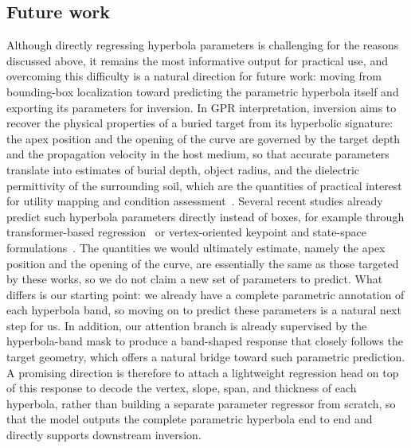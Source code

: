 \documentclass[lettersize,journal]{IEEEtran}
\begin{document}
\subsection{Future work}
Although directly regressing hyperbola parameters is challenging for the reasons
discussed above, it remains the most informative output for practical use, and
overcoming this difficulty is a natural direction for future work: moving from
bounding-box localization toward predicting the parametric hyperbola itself and
exporting its parameters for inversion. In GPR interpretation, inversion aims to
recover the physical properties of a buried target from its hyperbolic signature: the apex position
and the opening of the curve are governed by the target depth and the
propagation velocity in the host medium, so that accurate parameters translate
into estimates of burial depth, object radius, and the dielectric permittivity of
the surrounding soil, which are the quantities of practical interest for utility
mapping and condition assessment~\cite{liu2022pipeline}.
Several recent studies already predict such hyperbola parameters directly instead of
boxes, for example through transformer-based regression~\cite{jin2024gprformer,ge2024gprtransunet}
or vertex-oriented keypoint and state-space formulations~\cite{hou2025endtoend,lan2024statespace}.
The quantities we would ultimately estimate, namely the apex position and the opening of the
curve, are essentially the same as those targeted by these works, so we do not claim a
new set of parameters to predict.
What differs is our starting point: we already have a complete parametric annotation of
each hyperbola band, so moving on to predict these parameters is a natural next step for us.
In addition, our attention branch is already supervised by the hyperbola-band mask to produce
a band-shaped response that closely follows the target geometry, which offers a natural bridge
toward such parametric prediction.
A promising direction is therefore to attach a lightweight regression head on top of this
response to decode the vertex, slope, span, and thickness of each hyperbola, rather than
building a separate parameter regressor from scratch, so that the model outputs the complete
parametric hyperbola end to end and directly supports downstream inversion.
\end{document}
